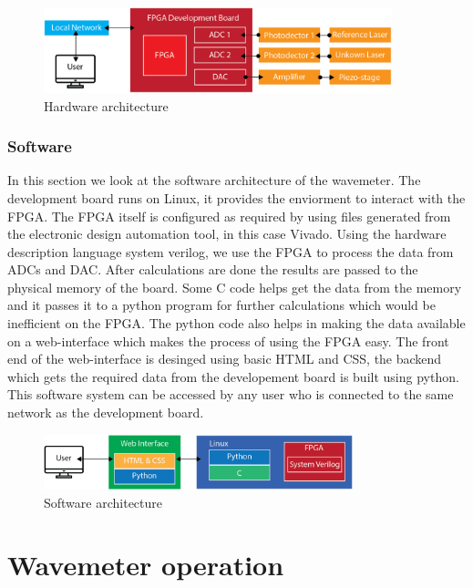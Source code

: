 \documentclass[12pt, twoside]{report}
\begin{document}
\vspace{1em}
\begin{figure}[H]
    \centering
    \includegraphics[width=0.9\textwidth]{figs/hw-arch.png}
    \caption{Hardware architecture}
    \label{fig:hw-arch}
\end{figure}

\subsection{Software}

In this section we look at the software architecture of the wavemeter. The development board runs on Linux, it provides the enviorment to interact with the FPGA. The FPGA itself is configured as required by using files generated from the electronic design automation tool, in this case Vivado. Using the hardware description language system verilog, we use the FPGA to process the data from ADCs and DAC. After calculations are done the results are passed to the physical memory of the board. Some C code helps get the data from the memory and it passes it to a python program for further calculations which would be inefficient on the FPGA. The python code also helps in making the data available on a web-interface which makes the process of using the FPGA easy. The front end of the web-interface is desinged using basic HTML and CSS, the backend which gets the required data from the developement board is built using python. This software system can be accessed by any user who is connected to the same network as the development board. 

\begin{figure}[H]
    \centering
    \includegraphics[width=0.8\textwidth]{figs/sw-arch.png}
    \caption{Software architecture}
    \label{fig:sw-arch}
\end{figure}


\chapter{Wavemeter operation}
\end{document}
